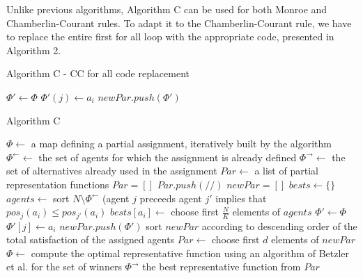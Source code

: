 Unlike previous algorithms, Algorithm C can be used for both Monroe and Chamberlin-Courant rules. To adapt it to the Chamberlin-Courant rule, we have to replace the entire first for all loop with the appropriate code, presented in Algorithm 2.

\begin{algorithm}
\caption{Algorithm C - CC for all code replacement}\label{euclid}
\begin{algorithmic}[1]
		\State $\Phi' \gets \Phi$
				\State $\Phi'(j) \gets a_{i}$
			\EndIf
		\EndFor
		\State $newPar.push(\Phi')$
	\EndFor
\end{algorithmic}
\end{algorithm}

\begin{algorithm}
\caption{Algorithm C}\label{euclid}
\begin{algorithmic}[1]
		\State $\Phi \gets$ a map defining a partial assignment, iteratively built by the algorithm
		\State $\Phi^{\leftarrow} \gets$ the set of agents for which the assignment is already defined
		\State $\Phi^{\rightarrow} \gets$ the set of alternatives already used in the assignment
		\State $Par \gets$ a list of partial representation functions
		\State $Par = []$
		\State $Par.push(/{/})$
			\State $newPar = []$
				\State $bests \gets \{\}$
					\State $agents \gets$ sort $N \setminus \Phi^{\leftarrow}$ (agent $j$ preceeds agent $j'$ implies that $pos_{j}(a_{i}) \leq pos_{j'}(a_{i})$
					\State $bests[a_{i}] \gets$ choose first $\frac{N}{K}$ elements of $agents$
					\State $\Phi' \gets \Phi$
						\State $\Phi'[j] \gets a_{i}$
					\EndFor
					\State $newPar.push(\Phi')$
				\EndFor
			\EndFor
			\State sort $newPar$ according to descending order of the total satisfaction of the assigned agents
			\State $Par \gets$ choose first $d$ elements of $newPar$
		\EndFor
			\State $\Phi \gets$ compute the optimal representative function using an algorithm of Betzler et al. \cite{3} for the set of winners $\Phi^{\rightarrow}$
		\EndFor
		\State \Return the best representative function from $Par$
	\EndProcedure
\end{algorithmic}
\end{algorithm}

